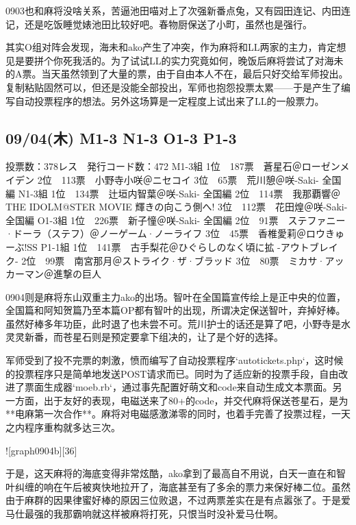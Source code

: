 0903也和麻将没啥关系，苦逼池田喵对上了次强新番点兔，又有园田连记、内田连记，还是吃饭睡觉婊池田比较好吧。春物厨保送了小町，虽然也是强行。

其实O组对阵会发现，海未和ako产生了冲突，作为麻将和LL两家的主力，肯定想见是要拼个你死我活的。为了试试LL的实力究竟如何，晚饭后麻将尝试了对海未的A票。当天虽然领到了大量的票，由于自由本人不在，最后只好交给军师投出。复制粘贴固然可以，但还是没能全部投出，军师也抱怨投票太累——于是产生了编写自动投票程序的想法。另外这场算是一定程度上试出来了LL的一般票力。

\subsection{09/04(木) M1-3 N1-3 O1-3 P1-3}

    投票数：378レス　発行コード数：472
    M1-3組
    1位　187票　蒼星石＠ローゼンメイデン
    2位　113票　小野寺小咲＠ニセコイ
    3位　65票　荒川憩＠咲-Saki- 全国編
    N1-3組
    1位　134票　辻垣内智葉＠咲-Saki- 全国編
    2位　114票　我那覇響＠THE IDOLM@STER MOVIE 輝きの向こう側へ!
    3位　112票　花田煌＠咲-Saki- 全国編
    O1-3組
    1位　226票　新子憧＠咲-Saki- 全国編
    2位　91票　ステファニー·ドーラ（ステフ）＠ノーゲーム·ノーライフ
    3位　45票　香椎愛莉＠ロウきゅーぶ!SS
    P1-1組
    1位　141票　古手梨花＠ひぐらしのなく頃に拡 -アウトブレイク-
    2位　99票　南宮那月＠ストライク·ザ·ブラッド
    3位　80票　ミカサ·アッカーマン＠進撃の巨人

0904则是麻将东山双重主力ako的出场。智叶在全国篇宣传绘上是正中央的位置，全国篇和阿知贺篇乃至本篇OP都有智叶的出现，所谓决定保送智叶，弃掉好棒。虽然好棒多年功臣，此时退了也未尝不可。荒川护士的话还是算了吧，小野寺是水灵灵新番，而苍星石则是预定要拿下组决的，让了是个好的选择。

军师受到了投不完票的刺激，愤而编写了自动投票程序`autotickets.php`，这时候的投票程序只是简单地发送POST请求而已。同时为了适应新的投票手段，自由改进了票面生成器`moeb.rb`，通过事先配置好萌文和code来自动生成文本票面。另一方面，出于友好的表现，电磁送来了80+的code，并交代麻将保送苍星石，是为**电麻第一次合作**。麻将对电磁感激涕零的同时，也着手完善了投票过程，一天之内程序重构就多达三次。

![graph0904b][36]

于是，这天麻将的海底变得非常炫酷，ako拿到了最高自不用说，白天一直在和智叶纠缠的响在午后被爽快地拉开了，海底甚至有了多余的票力来保好棒二位。虽然由于麻群的因果律蜜好棒的原因三位败退，不过两票差实在是有点嚣张了。于是爱马仕最强的我那霸响就这样被麻将打死，只恨当时没补爱马仕啊。

